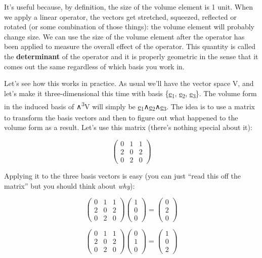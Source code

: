 \documentclass[oneside,english]{amsbook}
\numberwithin{section}{chapter}
\theoremstyle{plain}
\theoremstyle{definition}
\begin{document}
It's useful because, by definition, the size of the volume element is 1
unit. When we apply a linear operator, the vectors get stretched,
squeezed, reflected or rotated (or some combination of those things):
the volume element will probably change size. We can use the size of the
volume element after the operator has been applied to measure the
overall effect of the operator. This quantity is called the
\textbf{determinant} of the operator and it is properly geometric in the
sense that it comes out the same regardless of which basis you work in.

Let's see how this works in practice. As usual we'll have the vector
space V, and let's make it three-dimensional this time with basis
\{\ul{e}\textsubscript{1}, \ul{e}\textsubscript{2},
\ul{e}\textsubscript{3}\}. The volume form in the induced basis of
∧\textsuperscript{3}V will simply be
\ul{e}\textsubscript{1}∧\ul{e}\textsubscript{2}∧\ul{e}\textsubscript{3}.
The idea is to use a matrix to transform the basis vectors and then to
figure out what happened to the volume form as a result. Let's use this
matrix (there's nothing special about it):

\[\begin{pmatrix}
	0 & 1 & 1 \\
	2 & 0 & 2 \\
	0 & 2 & 0
\end{pmatrix}\]

Applying it to the three basis vectors is easy (you can just ``read this
off the matrix'' but you should think about \emph{why}):

\[\begin{pmatrix}
	0 & 1 & 1 \\
	2 & 0 & 2 \\
	0 & 2 & 0
\end{pmatrix}\begin{pmatrix}
	1 \\
	0 \\
	0
\end{pmatrix} = \begin{pmatrix}
	0 \\
	2 \\
	0
\end{pmatrix}\]

\[\begin{pmatrix}
	0 & 1 & 1 \\
	2 & 0 & 2 \\
	0 & 2 & 0
\end{pmatrix}\begin{pmatrix}
	0 \\
	1 \\
	0
\end{pmatrix} = \begin{pmatrix}
	1 \\
	0 \\
	2
\end{pmatrix}\]
\end{document}

